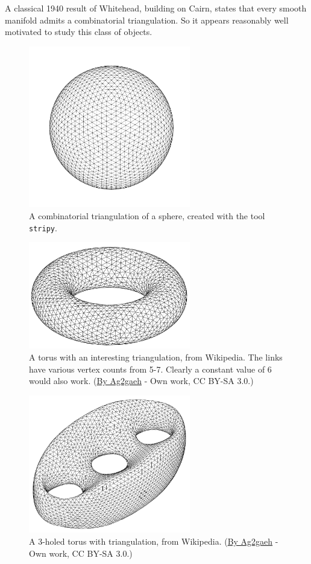A classical 1940 result of Whitehead, building on Cairn, states that every smooth manifold admits a combinatorial triangulation\cite{whitehead_triangulation}. So it appears reasonably well motivated to study this class of objects.

\begin{figure}[htbp]
\centering
\includegraphics[width=200pt]{triangulated_sphere.pdf}
\caption{A combinatorial triangulation of a sphere, created with the tool \texttt{stripy}.}
\label{fig:sphere_triangulation}
\end{figure}

\begin{figure}[htbp]
\centering
\includegraphics[width=200pt]{Torus-triang.png}
\caption{A torus with an interesting triangulation, from Wikipedia. The links have various vertex counts from 5-7. Clearly a constant value of 6 would also work. (\href{https://commons.wikimedia.org/w/index.php?curid=30856793}{By Ag2gaeh} - Own work, CC BY-SA 3.0.)}
\label{fig:torus_wiki_triangulation}
\end{figure}

\begin{figure}[htbp]
\centering
\includegraphics[width=200pt]{triangulated_genus3.pdf}
\caption{A 3-holed torus with triangulation, from Wikipedia. (\href{https://commons.wikimedia.org/wiki/File:Tri-brezel.svg}{By Ag2gaeh} - Own work, CC BY-SA 3.0.)}
\label{fig:genus3_wiki_triangulation}
\end{figure}

